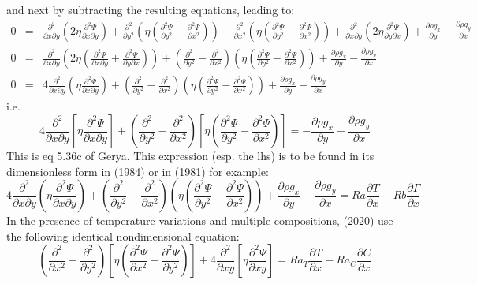 and next by subtracting the resulting equations, leading to:
\begin{eqnarray}
0 &=& 
\frac{\partial^2 }{\partial x \partial y} \left(2\eta \frac{\partial^2 \Psi}{\partial x \partial y} \right)
+ \frac{\partial^2 }{\partial y^2} \left( \eta (\frac{\partial^2 \Psi}{\partial y^2}-\frac{\partial^2 \Psi}{\partial x^2}) \right)
- \frac{\partial^2 }{\partial x^2} \left( \eta (\frac{\partial^2 \Psi}{\partial y^2}-\frac{\partial^2 \Psi}{\partial x^2}) \right) 
+ \frac{\partial^2 }{\partial x\partial y} \left(2\eta \frac{\partial^2 \Psi}{\partial y \partial x} \right)
+ \frac{\partial \rho g_x}{\partial y}
- \frac{\partial \rho g_y}{\partial x}
\nonumber\\
0 &=& 
\frac{\partial^2 }{\partial x \partial y} 
\left(2\eta (\frac{\partial^2 \Psi}{\partial x \partial y} 
+  \frac{\partial^2 \Psi}{\partial y \partial x} )
\right)
+ 
\left( 
\frac{\partial^2 }{\partial y^2}
- \frac{\partial^2 }{\partial x^2}
\right)
\left( \eta (\frac{\partial^2 \Psi}{\partial y^2}-\frac{\partial^2 \Psi}{\partial x^2}) \right)
+ \frac{\partial \rho g_x}{\partial y}
- \frac{\partial \rho g_y}{\partial x}
\nonumber\\
0 &=& 
4\frac{\partial^2 }{\partial x \partial y} 
\left(\eta \frac{\partial^2 \Psi}{\partial x \partial y} 
\right)
+ 
\left( 
\frac{\partial^2 }{\partial y^2}
- \frac{\partial^2 }{\partial x^2}
\right)
\left( \eta (\frac{\partial^2 \Psi}{\partial y^2}-\frac{\partial^2 \Psi}{\partial x^2}) \right)
+ \frac{\partial \rho g_x}{\partial y}
- \frac{\partial \rho g_y}{\partial x}
\end{eqnarray}
i.e.
\[
\boxed{
4\frac{\partial^2 }{\partial x \partial y} 
\left[\eta \frac{\partial^2 \Psi}{\partial x \partial y}  \right]
+ 
\left( 
\frac{\partial^2 }{\partial y^2}
- \frac{\partial^2 }{\partial x^2}
\right)
\left[ \eta (\frac{\partial^2 \Psi}{\partial y^2}-\frac{\partial^2 \Psi}{\partial x^2}) \right]
=
- \frac{\partial \rho g_x}{\partial y}
+ \frac{\partial \rho g_y}{\partial x}
}
\]
This is eq 5.36c of Gerya. 
This expression (esp. the lhs) is to be found in its dimensionless form in 
\textcite{chyu84} (1984) or in \textcite{scja81} (1981) for example:
\[
4\frac{\partial^2 }{\partial x \partial y} 
\left(\eta \frac{\partial^2 \Psi}{\partial x \partial y} 
\right)
+ 
\left( 
\frac{\partial^2 }{\partial y^2}
- \frac{\partial^2 }{\partial x^2}
\right)
\left( \eta (\frac{\partial^2 \Psi}{\partial y^2}-\frac{\partial^2 \Psi}{\partial x^2}) \right)
+ \frac{\partial \rho g_x}{\partial y}
- \frac{\partial \rho g_y}{\partial x}
=
Ra \frac{\partial T}{\partial x}
-Rb \frac{\partial \Gamma}{\partial x}
\]
In the presence of temperature variations and multiple compositions, 
\textcite{trlb20} (2020)  use the  following identical nondimensional equation:
\[
\left(
\frac{\partial^2 }{\partial x^2} - 
\frac{\partial^2 }{\partial y^2}  
\right)
\left[ \eta
\left(
\frac{\partial^2 \Psi}{\partial x^2} - 
\frac{\partial^2 \Psi}{\partial y^2}  
\right)
\right]
+4
\frac{\partial^2 }{\partial xy} 
\left[
\eta 
\frac{\partial^2 \Psi}{\partial xy} 
\right]
=
Ra_T \frac{\partial T}{\partial x}-
Ra_C \frac{\partial C}{\partial x}
\]

